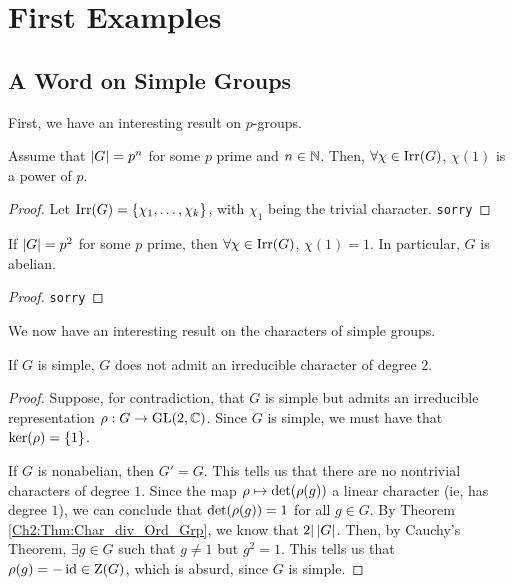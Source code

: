 \section{First Examples}

\subsection{A Word on Simple Groups}

First, we have an interesting result on $p$-groups.

\begin{lemma} Assume that $\left\lvert G \right\rvert = p^n$ for some $p$ prime and $n \in \mathbb{N}$. Then, $\forall \chi \in \operatorname{Irr}\!\left( G \right)$, $\chi(1)$ is a power of $p$.
\end{lemma}
\begin{proof}
    Let $\operatorname{Irr}\!\left( G \right) = \left\{ \chi_1, \ldots, \chi_k \right\}$, with $\chi_1$ being the trivial character.
    \verb|sorry|
\end{proof}
\begin{corollary}
    If $\left\lvert G \right\rvert = p^2$ for some $p$ prime, then $\forall \chi \in \operatorname{Irr}\!\left( G \right)$, $\chi(1) = 1$. In particular, $G$ is abelian.
\end{corollary}
\begin{proof}
    \verb|sorry|
\end{proof}

We now have an interesting result on the characters of simple groups.

\begin{lemma}
    If $G$ is simple, $G$ does not admit an irreducible character of degree $2$.
\end{lemma}
\begin{proof}
    Suppose, for contradiction, that $G$ is simple but admits an irreducible representation $\rho : G \to \operatorname{GL}\!\left( 2, \mathbb{C} \right)$. Since $G$ is simple, we must have that $\operatorname{ker}\!\left( \rho \right) = \left\{ 1 \right\}$.

    If $G$ is nonabelian, then $G' = G$. This tells us that there are no nontrivial characters of degree $1$. Since the map $\rho \mapsto \det\!\left( \rho(g) \right)$ a linear character (ie, has degree $1$), we can conclude that $\det\!\left( \rho(g) \right) = 1$ for all $g \in G$. By Theorem \ref{Ch2:Thm:Char_div_Ord_Grp}, we know that $2 \vert \left\lvert G \right\rvert$. Then, by Cauchy's Theorem, $\exists g \in G$ such that $g \neq 1$ but $g^2 = 1$. This tells us that $\rho(g) = -\operatorname{id} \in \operatorname{Z}\!\left( G \right)$, which is absurd, since $G$ is simple. 
\end{proof}
